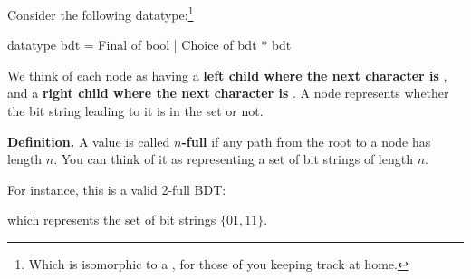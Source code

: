 \documentclass[addpoints,12pt]{exam}
\begin{document}
\begin{questions}
Consider the following datatype:\footnote{Which is isomorphic to a , for
those of you keeping track at home.}
\begin{codeblock}
  datatype bdt =
      Final of bool
    | Choice of bdt * bdt
\end{codeblock}

We think of each  node as having a \textbf{left child where the next character
is }, and a \textbf{right child where the next character is }. A
 node represents whether the bit string leading to it is
in the set or not.

\textbf{Definition.} A value  is called \textbf{$n$-full} if
any path from the root to a  node has length $n$. You can think of
it as representing a set of bit strings of length $n$.

For instance, this is a valid 2-full BDT:

\begin{center}
\end{center}

which represents the set of bit strings $\{ 01, 11 \}$.

\newpage

\end{questions}
\end{document}
